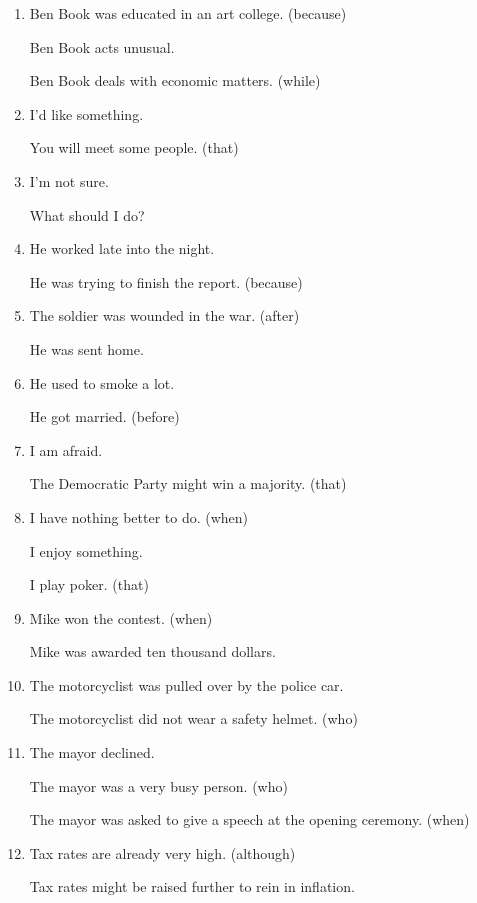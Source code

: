 \begin{enumerate}
\item Ben Book was educated in an art college. (because)

  Ben Book acts unusual.

  Ben Book deals with economic matters. (while)

\item I'd like something.

  You will meet some people. (that)


\item I'm not sure.

  What should I do?


\item He worked late into the night.

  He was trying to finish the report. (because)

\item The soldier was wounded in the war. (after)

  He was sent home.

\item He used to smoke a lot.

  He got married. (before)

\item I am afraid.

  The Democratic Party might win a majority. (that)

\item I have nothing better to do. (when)

  I enjoy something.

  I play poker. (that)

\item Mike won the contest. (when)

  Mike was awarded ten thousand dollars.

\item The motorcyclist was pulled over by the police car.

The motorcyclist did not wear a safety helmet. (who)

\item The mayor declined.

 The mayor was a very busy person. (who)

 The mayor was asked to give a speech at the opening ceremony. (when)

\item Tax rates are already very high. (although)

  Tax rates might be raised further to rein in inflation.


\end{enumerate}
